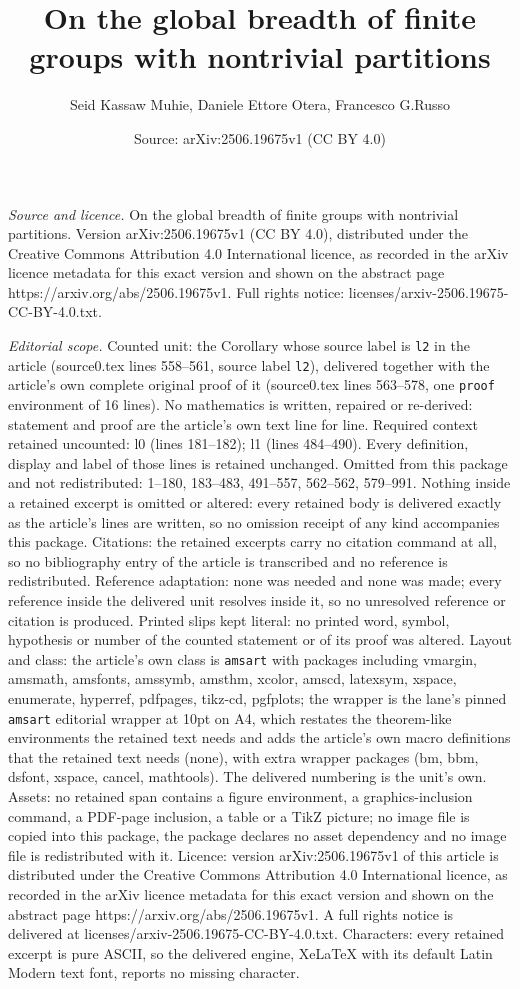 \documentclass[10pt,a4paper]{amsart}
\title[On the global breadth of finite groups with nontrivial parti]{On the global breadth of finite groups with nontrivial partitions}
\author{Seid Kassaw Muhie, Daniele Ettore Otera, Francesco G.Russo}
\date{Source: arXiv:2506.19675v1 (CC BY 4.0)}
\begin{document}
\maketitle

\noindent\emph{Source and licence.} On the global breadth of finite groups with nontrivial partitions. Version arXiv:2506.19675v1 (CC BY 4.0), distributed under the Creative Commons Attribution 4.0 International licence, as recorded in the arXiv licence metadata for this exact version and shown on the abstract page https://arxiv.org/abs/2506.19675v1. Full rights notice: licenses/arxiv-2506.19675-CC-BY-4.0.txt.\par\smallskip

\noindent\textit{Editorial scope.} Counted unit: the Corollary whose source label is \texttt{l2} in the article (source0.tex lines 558--561, source label \texttt{l2}), delivered together with the article's own complete original proof of it (source0.tex lines 563--578, one \texttt{proof} environment of 16 lines). No mathematics is written, repaired or re-derived: statement and proof are the article's own text line for line. Required context retained uncounted: l0 (lines 181--182); l1 (lines 484--490). Every definition, display and label of those lines is retained unchanged. Omitted from this package and not redistributed: 1--180, 183--483, 491--557, 562--562, 579--991. Nothing inside a retained excerpt is omitted or altered: every retained body is delivered exactly as the article's lines are written, so no omission receipt of any kind accompanies this package. Citations: the retained excerpts carry no citation command at all, so no bibliography entry of the article is transcribed and no reference is redistributed. Reference adaptation: none was needed and none was made; every reference inside the delivered unit resolves inside it, so no unresolved reference or citation is produced. Printed slips kept literal: no printed word, symbol, hypothesis or number of the counted statement or of its proof was altered. Layout and class: the article's own class is \texttt{amsart} with packages including vmargin, amsmath, amsfonts, amssymb, amsthm, xcolor, amscd, latexsym, xspace, enumerate, hyperref, pdfpages, tikz-cd, pgfplots; the wrapper is the lane's pinned \texttt{amsart} editorial wrapper at 10pt on A4, which restates the theorem-like environments the retained text needs and adds the article's own macro definitions that the retained text needs (none), with extra wrapper packages (bm, bbm, dsfont, xspace, cancel, mathtools). The delivered numbering is the unit's own. Assets: no retained span contains a figure environment, a graphics-inclusion command, a PDF-page inclusion, a table or a TikZ picture; no image file is copied into this package, the package declares no asset dependency and no image file is redistributed with it. Licence: version arXiv:2506.19675v1 of this article is distributed under the Creative Commons Attribution 4.0 International licence, as recorded in the arXiv licence metadata for this exact version and shown on the abstract page https://arxiv.org/abs/2506.19675v1. A full rights notice is delivered at licenses/arxiv-2506.19675-CC-BY-4.0.txt. Characters: every retained excerpt is pure ASCII, so the delivered engine, XeLaTeX with its default Latin Modern text font, reports no missing character.
\end{document}
